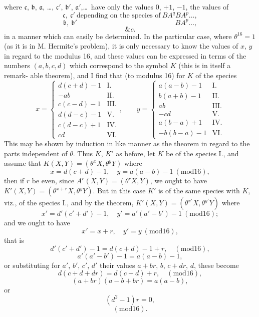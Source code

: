 \documentclass[11pt]{article}
\providecommand{\modd}{\mathrm{mod}}
\begin{document}
where $\mathfrak{c}$, $\mathfrak{b}$, $\mathfrak{a}$, \ldots, $\mathfrak{c}'$, $\mathfrak{b}'$, $\mathfrak{a}'$,\ldots\ have only the values $0$, $+1$, $-1$, the values of
\[ \mathfrak{c},\ \mathfrak{c}'\ \text{depending on the species of}\ BA^{q}BA^{p}\ldots, \]
\[ \mathfrak{b},\ \mathfrak{b}'\quad\phantom{\text{depending on the species of}}\quad BA^{p}\ldots, \]
\[ \&c. \]
in a manner which can easily be determined. In the particular case, where $\theta^{16}=1$
(as it is in M. Hermite's problem), it is only necessary to know the values of $x$, $y$
in regard to the modulus 16, and these values can be expressed in terms of the
numbers $(a,b,c,d)$ which correspond to the symbol $K$ (this is in itself a remark-%
able theorem), and I find that (to modulus 16) for $K$ of the species
\[ x = \left\{
\begin{array}{ll}
d(c+d)-1 & \text{I.} \\
-ab & \text{II.} \\
c(c-d)-1 & \text{III.} \\
d(d-c)-1 & \text{V.} \\
c(d-c)+1 & \text{IV.} \\
cd & \text{VI.}
\end{array}
\right.,\qquad
y = \left\{
\begin{array}{ll}
a(a-b)-1 & \text{I.} \\
b(a+b)-1 & \text{II.} \\
ab & \text{III.} \\
-cd & \text{V.} \\
a(b-a)+1 & \text{IV.} \\
-b(b-a)-1 & \text{VI.}
\end{array}
\right. \]
This may be shown by induction in like manner as the theorem in regard to the
parts independent of $\theta$. Thus $K$, $K'$ as before, let $K$ be of the species I., and
assume that $K(X,Y)=(\theta^{x}X,\theta^{y}Y)$ where
\[ x=d(c+d)-1,\quad y=a(a-b)-1\ (\modd 16), \]
then if $r$ be even, since $A^{r}(X,Y)=(\theta^{r}X,Y)$, we ought to have $K'(X,Y)=(\theta^{x+r}X,\theta^{y}Y)$.
But in this case $K'$ is of the same species with $K$, viz., of the species I., and by
the theorem, $K'(X,Y)=(\theta^{x'}X,\theta^{y'}Y)$ where
\[ x'=d'(c'+d')-1,\quad y'=a'(a'-b')-1\ (\modd 16); \]
and we ought to have
\[ x'=x+r,\quad y'=y\ (\modd 16), \]
that is
\[ d'(c'+d')-1 = d(c+d)-1+r,\quad (\modd 16), \]
\[ a'(a'-b')-1 = a(a-b)-1, \]
or substituting for $a'$, $b'$, $c'$, $d'$ their values $a+br$, $b$, $c+dr$, $d$, these become
\[ d(c+d+dr) = d(c+d)+r,\quad (\modd 16), \]
\[ (a+br)(a-b+br) = a(a-b), \]
or
\[ (d^{2}-1)r=0, \]
\[ (\modd 16). \]
\end{document}
